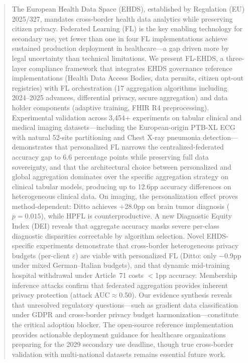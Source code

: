 \documentclass[conference,a4paper]{IEEEtran}
\begin{document}
\begin{abstract}
The European Health Data Space (EHDS), established by Regulation (EU) 2025/327, mandates cross-border health data analytics while preserving citizen privacy. Federated Learning (FL) is the key enabling technology for secondary use, yet fewer than one in four FL implementations achieve sustained production deployment in healthcare---a gap driven more by legal uncertainty than technical limitations. We present FL-EHDS, a three-layer compliance framework that integrates EHDS governance reference implementations (Health Data Access Bodies, data permits, citizen opt-out registries) with FL orchestration (17 aggregation algorithms including 2024--2025 advances, differential privacy, secure aggregation) and data holder components (adaptive training, FHIR R4 preprocessing). Experimental validation across 3,454+ experiments on tabular clinical and medical imaging datasets---including the European-origin PTB-XL ECG with natural 52-site partitioning and Chest X-ray pneumonia detection---demonstrates that personalized FL narrows the centralized-federated accuracy gap to 6.6 percentage points while preserving full data sovereignty, and that the architectural choice between personalized and global aggregation dominates over the specific aggregation strategy on clinical tabular models, producing up to 12.6pp accuracy differences on heterogeneous clinical data. On imaging, the personalization effect proves method-dependent: Ditto achieves $+$28.0pp on brain tumor diagnosis ($p{=}0.015$), while HPFL is counterproductive. A new Diagnostic Equity Index (DEI) reveals that aggregate accuracy masks severe per-class diagnostic disparities correctable by algorithm selection. Novel EHDS-specific experiments demonstrate that cross-border heterogeneous privacy budgets (per-client $\varepsilon$) are viable with personalized FL (Ditto: only $-$0.9pp under mixed German--Italian budgets), and that dynamic mid-training hospital withdrawal under Article~71 costs $<$1pp accuracy. Membership inference attacks confirm that federated aggregation provides inherent privacy protection (attack AUC$\approx$0.50). Our evidence synthesis reveals that unresolved regulatory questions---such as gradient data classification under GDPR and cross-border privacy budget harmonization---constitute the critical adoption blocker. The open-source reference implementation provides actionable deployment guidance for healthcare organizations preparing for the 2029 secondary use deadline, though true cross-border validation with multi-national datasets remains essential future work.
\end{abstract}
\end{document}
